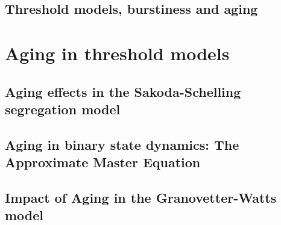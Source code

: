 \documentclass[
	10pt, %
	a4paper,
]{LegrandOrangeBook}
\begin{document}
\chapter{Threshold models, burstiness and aging}
%


\part{Aging in threshold models}

\chapterspaceabove{6.75cm}
\chapterspacebelow{7.25cm}

\chapter{\label{ch:Aging effects in the Sakoda-Schelling segregation model} Aging effects in the Sakoda-Schelling segregation model}
%

\chapterspaceabove{6.75cm}
\chapterspacebelow{7.25cm}

\chapter{\label{ch:Aging in binary state dynamics} Aging in binary state dynamics: The Approximate Master Equation}
%

\chapterspaceabove{6.75cm}
\chapterspacebelow{7.25cm}

\chapter{\label{ch:Aging in the Granovetter-Watts model} Impact of Aging in the Granovetter-Watts model}
%
\end{document}
